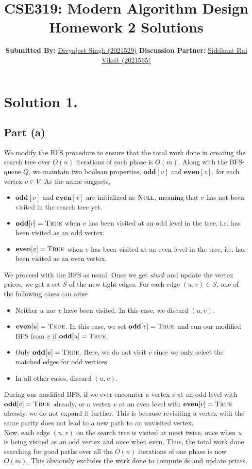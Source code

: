 \documentclass[9pt]{article}
\title{
    \textbf{CSE319: Modern Algorithm Design} \\
    \textbf{\large{Homework 2 Solutions}}
}
\author{
    \textbf{Submitted By:} \href{mailto:divyajeet21529@iiitd.ac.in}{Divyajeet Singh (2021529)}
    \hfill
    \textbf{Discussion Partner:} \href{mailto:siddhant21565@iiitd.ac.in}{Siddhant Rai Viksit (2021565)}
}
\date{}
\begin{document}
\maketitle

\section*{Solution 1.}
\subsection*{Part (a)}
We modify the BFS procedure to ensure that the total work done in creating the search tree over
$O(n)$ iterations of each phase is $O(m)$. Along with the BFS-queue $Q$, we maintain two boolean
properties, $\textbf{odd}[v]$ and $\textbf{even}[v]$, for each vertex $v \in V$. As the name
suggests,
\begin{itemize}
    \item $\textbf{odd}[v]$ and $\textbf{even}[v]$ are initialized as $\textsc{Null}$, meaning
    that $v$ has not been visited in the search tree yet.
    \item $\textbf{odd}[v] = \textsc{True}$ when $v$ has been visited at an odd level in the
    tree, i.e. has been visited as an odd vertex.
    \item $\textbf{even}[v] = \textsc{True}$ when $v$ has been visited at an even level in the
    tree, i.e. has been visited as an even vertex.
\end{itemize}
We proceed with the BFS as usual. Once we get \textit{stuck} and update the vertex prices, we
get a set $S$ of the new tight edges. For each edge $(u, v) \in S$, one of the following cases
can arise
\begin{itemize}
    \item Neither $u$ nor $v$ have been visited. In this case, we discard $(u, v)$.
    \item $\textbf{even}[u] = \textsc{True}$. In this case, we set $\textbf{odd}[v] = \textsc{True}$
    and run our modified BFS from $v$ if $\textbf{odd}[u] = \textsc{True}$.
    \item Only $\textbf{odd}[u] = \textsc{True}$. Here, we do not visit $v$ since we only
    select the matched edges for odd vertices.
    \item In all other cases, discard $(u, v)$.
\end{itemize}
During our modified BFS, if we ever encounter a vertex $v$ at an odd level with
$\textbf{odd}[v] = \textsc{True}$ already, or a vertex $v$ at an even level with
$\textbf{even}[v] = \textsc{True}$ already, we do not expand it further. This is
because revisiting a vertex with the same parity does not lead to a new path to an
unvisited vertex. \\
Now, each edge $(u, v)$ on the search tree is visited at most twice, once when $u$ is being
visited as an odd vertex and once when even. Thus, the total work done searching for good paths
over all the $O(n)$ iterations of one phase is now $O(m)$. This obviously excludes the work
done to compute $\delta$s and update prices.
\end{document}
